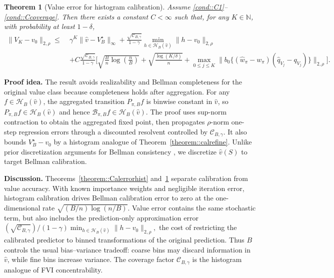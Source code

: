\documentclass{article}
\theoremstyle{plain}
\newtheorem{theorem}{Theorem}
\theoremstyle{definition}
\theoremstyle{remark}
\begin{document}
\begin{theorem}[Value error for histogram calibration]
\label{theorem::regretHist}
Assume \ref{cond::C1}--\ref{cond::Ccoverage}. Then there exists a constant
\(C<\infty\) such that, for any \(K\in\mathbb N\), with probability at least
\(1-\delta\),
{
\begin{align*}
\|V_K-v_0\|_{2,\rho}
\le\;&
\gamma^K\|\hat v-V_B^\star\|_{\infty}
+
\frac{\sqrt{\mathcal C_{B,\gamma}}}{1-\gamma}
\min_{h\in\mathcal H_B(\hat v)}\|h-v_0\|_{2,\rho}
\\
&+
C\frac{\sqrt{\mathcal C_{B,\gamma}}}{1-\gamma}
\Bigg[
  \sqrt{\frac{B}{n}\log\!\left(\frac{n}{B}\right)}
  +
  \sqrt{\frac{\log(K/\delta)}{n}}
 +
\max_{0\le j\le K}
\big\|
b_0\{
(\widehat w_\pi-w_\pi)
(\widehat q_{V_j}-q_{V_j})
\}
\big\|_{2,\rho}
\Bigg].
\end{align*}
}
\end{theorem}
\textbf{Proof idea.}
The result avoids realizability and Bellman completeness for the original value
class because completeness holds after aggregation. For any
\(f\in\mathcal H_B(\hat v)\), the aggregated transition \(P_{\pi,B}f\) is
binwise constant in \(\hat v\), so \(P_{\pi,B}f\in\mathcal H_B(\hat v)\)
and hence \(\mathcal B_{\pi,B}f\in\mathcal H_B(\hat v)\). The proof uses
sup-norm contraction to obtain the aggregated fixed point, then propagates
\(\rho\)-norm one-step regression errors through a discounted resolvent
controlled by \(\mathcal C_{B,\gamma}\). It also bounds
\(V_B^\star-v_0\) by a histogram analogue of
Theorem~\ref{theorem::calrefine}. Unlike prior discretization arguments for
Bellman consistency
\citep{whitt1978approximations,peng1993convergence,van2006performance,
chen2019information,xie2021batch}, we discretize \(\hat v(S)\) to
target Bellman calibration.
 
\textbf{Discussion.}
Theorems~\ref{theorem::Calerrorhist} and~\ref{theorem::regretHist} separate
calibration from value accuracy. With known importance weights and negligible
iteration error, histogram calibration drives Bellman calibration error to zero
at the one-dimensional rate \(\sqrt{(B/n)\log(n/B)}\). Value error contains the
same stochastic term, but also includes the prediction-only approximation error $(\sqrt{\mathcal C_{B,\gamma}})/(1-\gamma)
\min_{h\in\mathcal H_B(\hat v)}\|h-v_0\|_{2,\rho},$ the cost of restricting the calibrated predictor to binned transformations of
the original prediction. Thus \(B\) controls the usual bias--variance tradeoff:
coarse bins may discard information in \(\hat v\), while fine bins increase
variance. The coverage factor \(\mathcal C_{B,\gamma}\) is the histogram
analogue of FVI concentrability.
\end{document}
